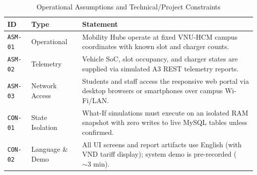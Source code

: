 \begin{table}[H]
  \centering
  \singlespacing\footnotesize
  \caption{Operational Assumptions and Technical/Project Constraints}
  \label{tab:assumptions}
  \renewcommand{\arraystretch}{1.25}
  \begin{tabularx}{\textwidth}{|C{1.6cm}|L{2.9cm}|Y|}
    \hline
    \textbf{ID} & \textbf{Type} & \textbf{Statement} \\
    \hline
    \texttt{ASM-01} & Operational & Mobility Hubs operate at fixed VNU-HCM campus coordinates with known slot and charger counts. \\
    \hline
    \texttt{ASM-02} & Telemetry & Vehicle SoC, slot occupancy, and charger states are supplied via simulated A3 REST telemetry reports. \\
    \hline
    \texttt{ASM-03} & Network Access & Students and staff access the responsive web portal via desktop browsers or smartphones over campus Wi-Fi/LAN. \\
    \hline
    \texttt{CON-01} & State Isolation & What-If simulations must execute on an isolated RAM snapshot with zero writes to live MySQL tables unless confirmed. \\
    \hline
    \texttt{CON-02} & Language \& Demo & All UI screens and report artifacts use English (with VND tariff display); system demo is pre-recorded ($\sim 3\text{ min}$). \\
    \hline
  \end{tabularx}
\end{table}
